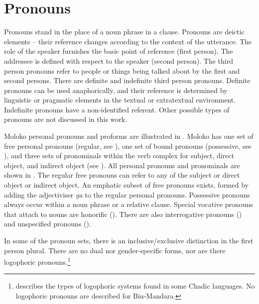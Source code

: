 \section{Pronouns}\label{sec:3.1}
\hypertarget{RefHeading1210821525720847}{}
Pronouns stand in the place of a noun phrase in a clause.  Pronouns are deictic elements -- their reference changes according to the context of the utterance.  The role of the speaker furnishes the basic point of reference (first person). The addressee is defined with respect to the speaker (second person).  The third person pronouns refer to people or things being talked about by the first and second persons. There are definite and indefinite third person pronouns. Definite pronouns can be used anaphorically, and their reference is determined by linguistic or pragmatic elements in the textual or extratextual environment. Indefinite pronouns have a non-identified referent. Other possible types of pronouns are not discussed in this work. 

Moloko personal pronouns and proforms are illustrated in . Moloko has one set of free personal pronouns (regular, see ), one set of bound pronouns (possessive, see ), and three sets of pronominals within the verb complex for subject, direct object, and indirect object (see ). All personal pronouns and pronominals are shown in . The regular free pronouns can refer to any of the subject or direct object or indirect object. An emphatic subset of free pronouns exists, formed by adding the adjectiviser \textit{ga} to the regular personal pronouns. Possessive pronouns always occur within a noun phrase or a relative clause. Special vocative pronouns that attach to nouns are honorific ().  There are also interrogative pronouns () and unspecified pronouns (). 

\clearpage
In some of the pronoun sets, there is an inclusive/exclusive distinction in the first person plural. There are no dual nor gender-specific forms, nor are there logophoric pronouns.\footnote{\citet{Frajzyngier1985} describes the types of logophoric systems found in some Chadic languages. No logophoric pronouns are described for Biu-Mandara. }  

